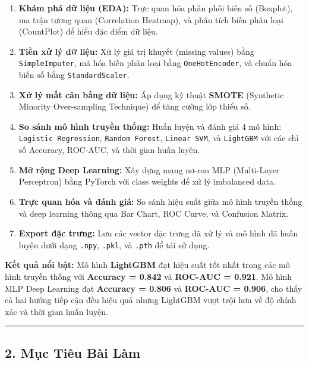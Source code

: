 \documentclass[
]{article}
\providecommand{\tightlist}{%
  \setlength{\itemsep}{0pt}\setlength{\parskip}{0pt}}
\begin{document}
\begin{enumerate}
\def\labelenumi{\arabic{enumi}.}
\tightlist
\item
  \textbf{Khám phá dữ liệu (EDA):} Trực quan hóa phân phối biến số
  (Boxplot), ma trận tương quan (Correlation Heatmap), và phân tích biến
  phân loại (CountPlot) để hiểu đặc điểm dữ liệu.
\item
  \textbf{Tiền xử lý dữ liệu:} Xử lý giá trị khuyết (missing values)
  bằng \texttt{SimpleImputer}, mã hóa biến phân loại bằng
  \texttt{OneHotEncoder}, và chuẩn hóa biến số bằng
  \texttt{StandardScaler}.
\item
  \textbf{Xử lý mất cân bằng dữ liệu:} Áp dụng kỹ thuật \textbf{SMOTE}
  (Synthetic Minority Over-sampling Technique) để tăng cường lớp thiểu
  số.
\item
  \textbf{So sánh mô hình truyền thống:} Huấn luyện và đánh giá 4 mô
  hình: \texttt{Logistic\ Regression}, \texttt{Random\ Forest},
  \texttt{Linear\ SVM}, và \texttt{LightGBM} với các chỉ số Accuracy,
  ROC-AUC, và thời gian huấn luyện.
\item
  \textbf{Mở rộng Deep Learning:} Xây dựng mạng nơ-ron MLP (Multi-Layer
  Perceptron) bằng PyTorch với class weights để xử lý imbalanced data.
\item
  \textbf{Trực quan hóa và đánh giá:} So sánh hiệu suất giữa mô hình
  truyền thống và deep learning thông qua Bar Chart, ROC Curve, và
  Confusion Matrix.
\item
  \textbf{Export đặc trưng:} Lưu các vector đặc trưng đã xử lý và mô
  hình đã huấn luyện dưới dạng \texttt{.npy}, \texttt{.pkl}, và
  \texttt{.pth} để tái sử dụng.
\end{enumerate}

\textbf{Kết quả nổi bật:} Mô hình \textbf{LightGBM} đạt hiệu suất tốt
nhất trong các mô hình truyền thống với \textbf{Accuracy = 0.842} và
\textbf{ROC-AUC = 0.921}. Mô hình MLP Deep Learning đạt \textbf{Accuracy
= 0.806} và \textbf{ROC-AUC = 0.906}, cho thấy cả hai hướng tiếp cận đều
hiệu quả nhưng LightGBM vượt trội hơn về độ chính xác và thời gian huấn
luyện.

\begin{center}\rule{0.5\linewidth}{0.5pt}\end{center}

\subsection{2. Mục Tiêu Bài Làm}\label{2-mux1ee5c-tiuxeau-buxe0i-luxe0m}
\end{document}
